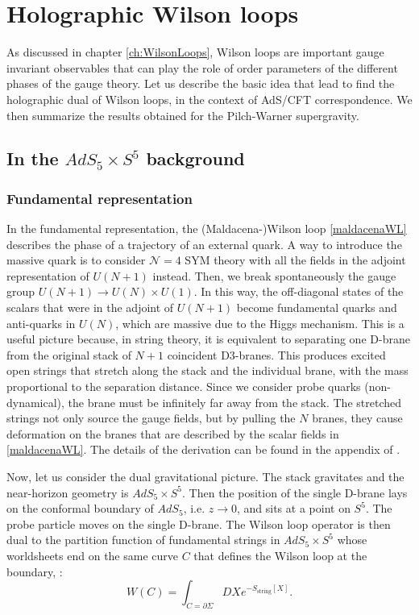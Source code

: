 \chapter{Holographic Wilson loops}

As discussed in chapter \ref{ch:WilsonLoops}, Wilson loops are important gauge invariant observables 
that can play the role of order parameters of the different phases of the gauge theory.
Let us describe the basic idea that lead to find the holographic dual of Wilson loops, 
in the context of AdS/CFT correspondence. We then summarize the results obtained for the Pilch-Warner supergravity.


\section{In the $AdS_5 \times S^5$ background}


\subsection{Fundamental representation}
In the fundamental representation, the (Maldacena-)Wilson loop \eqref{maldacenaWL}
describes the phase of a trajectory of an external quark. 
A way to introduce the massive quark is to consider $\mathcal{N}=4$ SYM theory with all the fields in the adjoint representation
of $U(N+1)$ instead.
Then, we break spontaneously the gauge group $U(N+1) \rightarrow U(N) \times U(1)$.
In this way, the off-diagonal states of the scalars that were in the adjoint of $U(N+1)$
become fundamental quarks and anti-quarks in $U(N)$, 
which are massive due to the Higgs mechanism. 
This is a useful picture because, in string theory, 
it is equivalent to separating one D-brane from the original stack of $N+1$ coincident D3-branes.
This produces excited open strings that stretch along the stack and the individual brane,
with the mass proportional to the separation distance. 
Since we consider probe quarks (non-dynamical), the brane must be infinitely far away from the stack.
The stretched strings not only source the gauge fields, but by pulling the $N$ branes, 
they cause deformation on the branes that are described by the scalar fields in \eqref{maldacenaWL}. 
The details of the derivation can be found in the appendix of \cite{Drukker:1999zq}.

Now, let us consider the dual gravitational picture. 
The stack gravitates and the near-horizon geometry is $AdS_5 \times S^5$. 
Then the position of the single D-brane lays on the conformal boundary of $AdS_5$, i.e. $z\rightarrow 0$, 
and sits at a point on $S^5$. 
The probe particle moves on the single D-brane.
The Wilson loop operator is then dual to the partition function of fundamental strings in $AdS_5 \times S^5$ 
whose worldsheets end on the same curve $C$ that defines the Wilson loop at the boundary, \cite{Maldacena:1998im}:
\begin{equation}
 W(C) = \int_{C=\partial \Sigma} DX e^{-S_\text{string}[X]}.
\end{equation}

